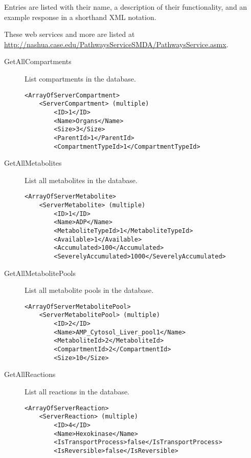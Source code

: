 Entries are listed with their name, a description of their functionality, and
an example response in a shorthand XML notation.

These web services and more are listed at \\
\href{http://nashua.case.edu/PathwaysServiceSMDA/PathwaysService.asmx}{http://nashua.case.edu/PathwaysServiceSMDA/PathwaysService.asmx}.

\begin{description}

    \item[GetAllCompartments] List compartments in the database.

    \begin{lstlisting}
<ArrayOfServerCompartment>
    <ServerCompartment> (multiple)
        <ID>1</ID>
        <Name>Organs</Name>
        <Size>3</Size>
        <ParentId>1</ParentId>
        <CompartmentTypeId>1</CompartmentTypeId>
    \end{lstlisting}

    \item[GetAllMetabolites] List all metabolites in the database.

    \begin{lstlisting}
<ArrayOfServerMetabolite>
    <ServerMetabolite> (multiple)
        <ID>1</ID>
        <Name>ADP</Name>
        <MetaboliteTypeId>1</MetaboliteTypeId>
        <Available>1</Available>
        <Accumulated>100</Accumulated>
        <SeverelyAccumulated>1000</SeverelyAccumulated>
    \end{lstlisting}

    \item[GetAllMetabolitePools] List all metabolite pools in the database.

    \begin{lstlisting}
<ArrayOfServerMetabolitePool>
    <ServerMetabolitePool> (multiple)
        <ID>2</ID>
        <Name>AMP_Cytosol_Liver_pool1</Name>
        <MetaboliteId>2</MetaboliteId>
        <CompartmentId>2</CompartmentId>
        <Size>10</Size>
    \end{lstlisting}

    \item[GetAllReactions] List all reactions in the database.

    \begin{lstlisting}
<ArrayOfServerReaction>
    <ServerReaction> (multiple)
        <ID>4</ID>
        <Name>Hexokinase</Name>
        <IsTransportProcess>false</IsTransportProcess>
        <IsReversible>false</IsReversible>
    \end{lstlisting}


\end{description}
